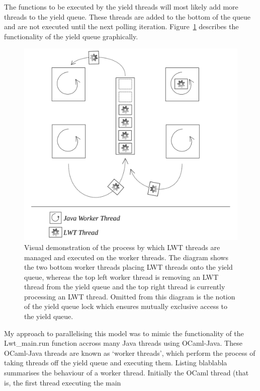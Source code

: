 \documentclass[12pt,twoside,notitlepage]{report}
\begin{document}
The functions to be executed by the yield threads will most likely add more threads to the yield queue. These threads are added to the bottom of the queue and are not executed until the next polling iteration.
Figure~\ref{fig:yield_queue} describes the functionality of the yield queue graphically.
\begin{figure}[h!]
\includegraphics[width=\linewidth]{yield_queue}
\caption{Visual demonstration of the process by which LWT threads are managed and executed on the worker threads. The diagram shows the two bottom worker threads placing LWT threads onto the yield queue, whereas the top left worker
thread is removing an LWT thread from the yield queue and the top right thread is currently processing an LWT thread. Omitted from this diagram is the notion of the yield queue lock which ensures mutually exclusive access to the yield
queue.}
\label{fig:yield_queue}
\end{figure}
%
%
My approach to parallelising this model was to mimic the functionality of the Lwt\_main.run function accross many Java threads using OCaml-Java. These OCaml-Java threads are known as `worker threads', which perform the process of
taking threads off the yield queue and executing them. Listing blablabla summarises the behaviour of a worker thread. Initially the OCaml thread (that is, the first thread executing the main
\end{document}

